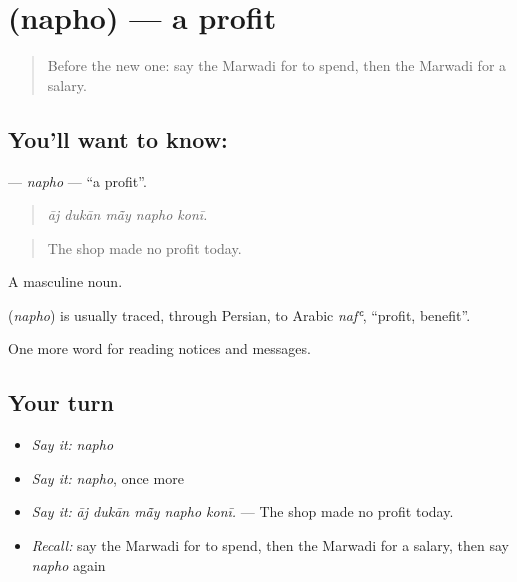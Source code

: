\section[\texorpdfstring{\mw{नफो} (napho)}{नफो (napho)}]{ (napho) — a profit}

\label{lesson:MW-C194-napho}



\begin{quote}
Before the new one: say the Marwadi for to spend, then the Marwadi for a salary.
\end{quote}

\subsection*{You'll want to know: }
\textbf{} — \emph{napho} — \textquotedblleft{}a profit\textquotedblright{}.

\begin{quote}
    
\end{quote}

\begin{quote}
\emph{āj dukān mā̃y napho konī.}
\end{quote}

\begin{quote}
The shop made no profit today.
\end{quote}

A masculine noun.

\begin{cousinweb}
\textbf{} (\emph{napho}) is usually traced, through Persian, to Arabic \emph{nafʿ}, \textquotedblleft{}profit, benefit\textquotedblright{}.
\end{cousinweb}

\begin{grammarlens}[title={What you've built}]
One more word for reading notices and messages.
\end{grammarlens}

\subsection*{Your turn}
\begin{itemize}
\raggedright
  \item \emph{Say it:} \emph{napho}
  \item \emph{Say it:} \emph{napho}, once more
  \item \emph{Say it:} \emph{āj dukān mā̃y napho konī.} — The shop made no profit today.
  \item \emph{Recall:} say the Marwadi for to spend, then the Marwadi for a salary, then say \emph{napho} again
\end{itemize}


